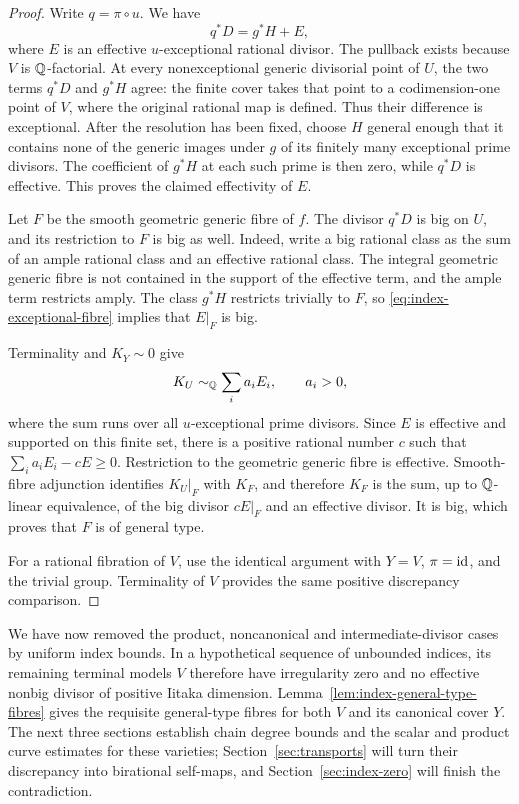 \begin{proof}
Write \(q=\pi\circ u\).  We have
\begin{equation}\label{eq:index-exceptional-fibre}
                           q^*D=g^*H+E,
\end{equation}
where \(E\) is an effective \(u\)-exceptional rational divisor.
The pullback exists because \(V\) is \(\mathbb Q\)-factorial.  At every
nonexceptional generic divisorial point of \(U\), the two terms
\(q^*D\) and \(g^*H\) agree: the finite cover takes that point to a
codimension-one point of \(V\), where the original rational map is
defined.  Thus their difference is exceptional.  After the resolution
has been fixed, choose \(H\) general enough that it contains none of
the generic images under \(g\) of its finitely many exceptional
prime divisors.  The coefficient of \(g^*H\) at each such prime is
then zero, while \(q^*D\) is effective.  This proves the claimed
effectivity of \(E\).

Let \(F\) be the smooth geometric generic fibre of \(f\).  The divisor
\(q^*D\) is big on \(U\), and its restriction to \(F\) is big as
well.  Indeed, write a big rational class as the sum of an ample
rational class and an effective rational class.  The integral
geometric generic fibre is not contained in the support of the
effective term, and the ample term restricts amply.  The class
\(g^*H\) restricts trivially to \(F\), so
\eqref{eq:index-exceptional-fibre} implies that \(E|_F\) is big.

Terminality and \(K_Y\sim0\) give
\[
                        K_U\sim_{\mathbb Q}\sum_i a_iE_i,
                       \qquad a_i>0,
\]
where the sum runs over all \(u\)-exceptional prime divisors.
Since \(E\) is effective and supported on this finite set, there is
a positive rational number \(c\) such that
\(\sum_i a_iE_i-cE\ge0\).  Restriction to the geometric generic
fibre is effective.  Smooth-fibre adjunction identifies
\(K_U|_F\) with \(K_F\), and therefore \(K_F\) is the sum, up to
\(\mathbb Q\)-linear equivalence, of the big divisor \(cE|_F\) and an
effective divisor.  It is big, which proves that \(F\) is of
general type.

For a rational fibration of \(V\), use the identical argument with
\(Y=V\), \(\pi=\operatorname{id}\), and the trivial group.  Terminality of \(V\)
provides the same positive discrepancy comparison.
\end{proof}


We have now removed the product, noncanonical and intermediate-divisor
cases by uniform index bounds. In a hypothetical sequence of unbounded
indices, its remaining terminal models $V$ therefore have irregularity
zero and no effective nonbig divisor of positive Iitaka dimension.
Lemma~\ref{lem:index-general-type-fibres} gives the requisite general-type
fibres for both $V$ and its canonical cover $Y$. The next three sections
establish chain degree bounds and the scalar and product curve estimates
for these varieties;
Section~\ref{sec:transports} will turn their discrepancy into birational
self-maps, and Section~\ref{sec:index-zero} will finish the contradiction.
